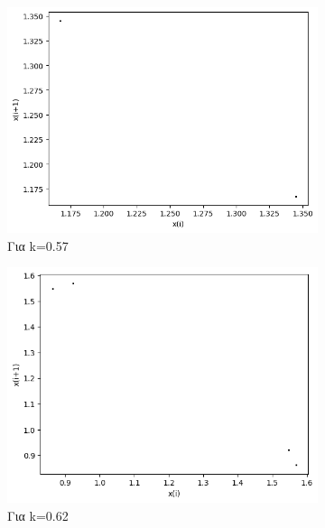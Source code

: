 \begin{figure}[h!]
\begin{subfigure}[b]{0.25\textwidth}
		\includegraphics[width=\textwidth]{LateX images/graphs q09/g5}
		\caption{Για k=0.57}
		\label{f:k50}
	\end{subfigure}
	\begin{subfigure}[b]{0.25\textwidth}
		\centering
		\includegraphics[width=\textwidth]{LateX images/graphs q09/g6}
		\caption{Για k=0.62}
		\label{f:k51}
	\end{subfigure}
	\hfill
	\begin{subfigure}[b]{0.25\textwidth}
		\centering

\end{subfigure}
\end{figure}
